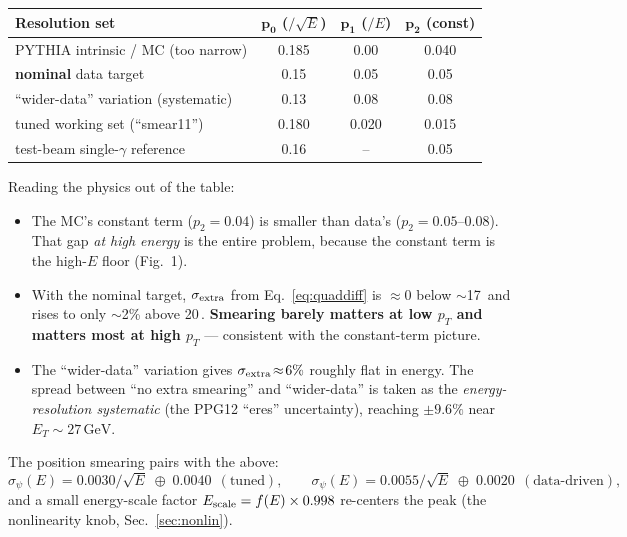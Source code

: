 \documentclass[11pt]{article}
\newcommand{\quadsum}{\;\oplus\;}
\newcommand{\GeV}{\,\text{GeV}}
\begin{document}
\begin{center}
\renewcommand{\arraystretch}{1.25}
\begin{tabular}{l c c c}
\toprule
\textbf{Resolution set} & $\boldsymbol{p_0}$ ($/\sqrt{E}$) & $\boldsymbol{p_1}$ ($/E$) & $\boldsymbol{p_2}$ (const)\\
\midrule
PYTHIA intrinsic / MC  (too narrow)        & 0.185 & 0.00  & 0.040 \\
\textbf{nominal} data target               & 0.15  & 0.05  & 0.05  \\
``wider-data'' variation (systematic)      & 0.13  & 0.08  & 0.08  \\
tuned working set (``smear11'')            & 0.180 & 0.020 & 0.015 \\
test-beam single-$\gamma$ reference        & 0.16  & --    & 0.05  \\
\bottomrule
\end{tabular}
\end{center}

\noindent Reading the physics out of the table:
\begin{itemize}[nosep]
  \item The MC's constant term ($p_2\!=\!0.04$) is smaller than data's
        ($p_2\!=\!0.05$--$0.08$). That gap \emph{at high energy} is the entire
        problem, because the constant term is the high-$E$ floor (Fig.~1).
  \item With the nominal target, $\sigma_{\rm extra}$ from
        Eq.~\eqref{eq:quaddiff} is $\approx 0$ below $\sim$17\GeV{} and rises to
        only $\sim$2\% above 20\GeV. \textbf{Smearing barely matters at low
        $p_T$ and matters most at high $p_T$} --- consistent with the
        constant-term picture.
  \item The ``wider-data'' variation gives $\sigma_{\rm extra}\!\approx\!6\%$
        roughly flat in energy. The spread between ``no extra smearing'' and
        ``wider-data'' is taken as the \emph{energy-resolution systematic} (the
        PPG12 ``eres'' uncertainty), reaching $\pm9.6\%$ near $E_T\!\sim\!27\GeV$.
\end{itemize}

The position smearing pairs with the above:
\begin{equation}
  \sigma_\psi(E)=0.0030/\sqrt{E}\quadsum 0.0040\ \ (\text{tuned}),\qquad
  \sigma_\psi(E)=0.0055/\sqrt{E}\quadsum 0.0020\ \ (\text{data-driven}),
\end{equation}
and a small energy-scale factor $E_{\rm scale}=f(E)\times0.998$ re-centers the
peak (the nonlinearity knob, Sec.~\ref{sec:nonlin}).
\end{document}
